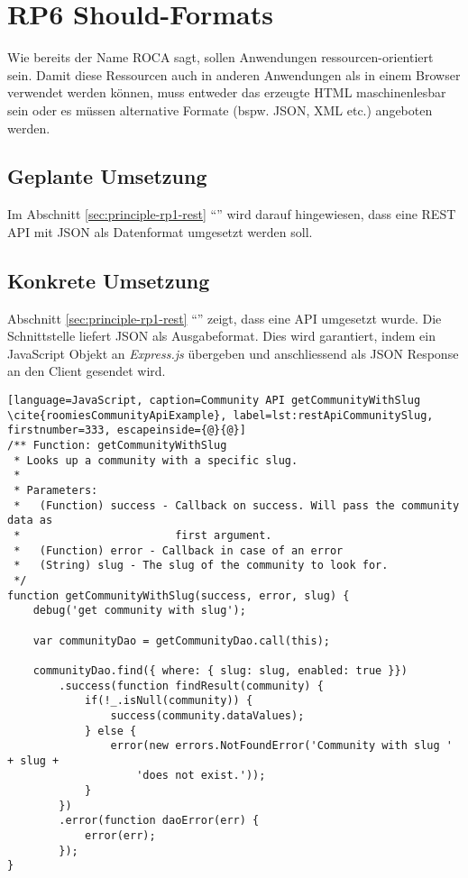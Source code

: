 \section{RP6 Should-Formats}
\label{sec:principle-rp6-should-formats}
Wie bereits der Name ROCA sagt, sollen Anwendungen ressourcen-orientiert sein. Damit diese Ressourcen auch in anderen Anwendungen als in einem Browser verwendet werden können, muss entweder das erzeugte HTML maschinenlesbar sein oder es müssen alternative Formate (bspw. JSON, XML etc.) angeboten werden.

\subsection*{Geplante Umsetzung}
Im Abschnitt \ref{sec:principle-rp1-rest} ``'' wird darauf hingewiesen, dass eine REST API mit JSON als Datenformat umgesetzt werden soll.

\subsection*{Konkrete Umsetzung}
Abschnitt \ref{sec:principle-rp1-rest} ``'' zeigt, dass eine API umgesetzt wurde.
Die Schnittstelle liefert JSON als Ausgabeformat. Dies wird garantiert, indem ein JavaScript Objekt an \emph{Express.js} übergeben und anschliessend als JSON Response \cite{ExpressjsResponseJsonConverter} an den Client gesendet \cite{ExpressjsResSend} wird.

\begin{lstlisting}[language=JavaScript, caption=Community API getCommunityWithSlug \cite{roomiesCommunityApiExample}, label=lst:restApiCommunitySlug, firstnumber=333, escapeinside={@}{@}]
/** Function: getCommunityWithSlug
 * Looks up a community with a specific slug.
 *
 * Parameters:
 *   (Function) success - Callback on success. Will pass the community data as
 *                        first argument.
 *   (Function) error - Callback in case of an error
 *   (String) slug - The slug of the community to look for.
 */
function getCommunityWithSlug(success, error, slug) {
	debug('get community with slug');

	var communityDao = getCommunityDao.call(this);

	communityDao.find({ where: { slug: slug, enabled: true }})
		.success(function findResult(community) {
			if(!_.isNull(community)) {
				success(community.dataValues);
			} else {
				error(new errors.NotFoundError('Community with slug ' + slug +
					'does not exist.'));
			}
		})
		.error(function daoError(err) {
			error(err);
		});
}
\end{lstlisting}

